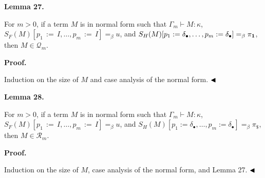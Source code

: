 \documentclass[10pt,a4paper]{amsart}
\begin{document}
 
 
\par\medskip\noindent\textbf{Lemma 27.}\par
 
 
For $m>0$, if a term $M$ is in normal form such that $\Gamma_{m}\vdash M:\kappa$, $S_{F}(M)[p_{1}{\,:=\,}I,\ldots,p_{m}{\,:=\,}I]=_{\beta}u$, and $S_{H}(M)[p_{1}:=\delta_{\bullet},\ldots,p_{m}:=\delta_{\bullet}]=_{\beta}\pi_{%
\mathbf{1}}$, then $M\in\mathcal{Q}_{m}$.\par
 
 
 
 
\par\medskip\noindent\textbf{Proof.}\par
 
 
Induction on the size of $M$ and case analysis of the normal form. $\hfill\blacktriangleleft$\par
 
 
 
\par\medskip\noindent\textbf{Lemma 28.}\par
 
 
For $m>0$, if a term $M$ is in normal form such that $\Gamma_{m}\vdash M:\kappa$, $S_{F}(M)[p_{1}{\,:=\,}I,\ldots,p_{m}{\,:=\,}I]=_{\beta}u$, and $S_{H}(M)[p_{1}:=\delta_{\bullet},\ldots,p_{m}:=\delta_{\bullet}]=_{\beta}\pi_{\$}$, then $M\in\mathcal{R}_{m}$.\par
 
 
 
 
 
\par\medskip\noindent\textbf{Proof.}\par
 
 
Induction on the size of $M$, case analysis of the normal form, and Lemma 27. $\hfill\blacktriangleleft$\par
 
\end{document}
